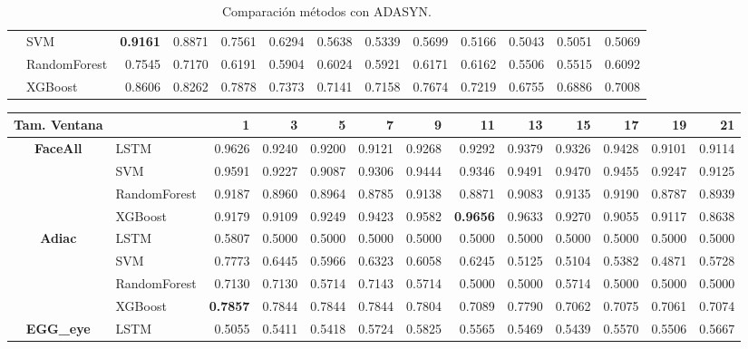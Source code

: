 \begin{table}[h]
\begin{adjustbox}{max width=15cm}
\begin{tabular}{|c|l|r|r|r|r|r|r|r|r|r|r|r|}
		& SVM &  \textbf{0.9161} &  0.8871 &  0.7561 &  0.6294 &  0.5638 &  0.5339 &  0.5699 &  0.5166 &  0.5043 &  0.5051 &  0.5069 \\
		& RandomForest &  0.7545 &  0.7170 &  0.6191 &  0.5904 &  0.6024 &  0.5921 &  0.6171 &  0.6162 &  0.5506 &  0.5515 &  0.6092 \\
		& XGBoost &  0.8606 &  0.8262 &  0.7878 &  0.7373 &  0.7141 &  0.7158 &  0.7674 &  0.7219 &  0.6755 &  0.6886 &  0.7008 \\
		\hline
\end{tabular}
\end{adjustbox}
\caption{Comparación métodos con ADASYN.}
\label{tab:all_comp_adasyn}
\end{table}
\newpage
\begin{table}[h]
\centering
\begin{adjustbox}{max width=15cm}
\begin{tabular}{|c|l|r|r|r|r|r|r|r|r|r|r|r|}
		\hline
		\textbf{Tam. Ventana}&         &      1  &      3  &      5  &      7  &      9  &      11 &      13 &      15 &      17 &      19 &      21 \\
		\hline
		\textbf{FaceAll} & LSTM &  0.9626 &  0.9240 &  0.9200 &  0.9121 &  0.9268 &  0.9292 &  0.9379 &  0.9326 &  0.9428 &  0.9101 &  0.9114 \\
		& SVM &  0.9591 &  0.9227 &  0.9087 &  0.9306 &  0.9444 &  0.9346 &  0.9491 &  0.9470 &  0.9455 &  0.9247 &  0.9125 \\
		& RandomForest &  0.9187 &  0.8960 &  0.8964 &  0.8785 &  0.9138 &  0.8871 &  0.9083 &  0.9135 &  0.9190 &  0.8787 &  0.8939 \\
		& XGBoost &  0.9179 &  0.9109 &  0.9249 &  0.9423 &  0.9582 &  \textbf{0.9656} &  0.9633 &  0.9270 &  0.9055 &  0.9117 &  0.8638 \\
		\hline
		\textbf{Adiac} & LSTM &  0.5807 &  0.5000 &  0.5000 &  0.5000 &  0.5000 &  0.5000 &  0.5000 &  0.5000 &  0.5000 &  0.5000 &  0.5000 \\
		& SVM &  0.7773 &  0.6445 &  0.5966 &  0.6323 &  0.6058 &  0.6245 &  0.5125 &  0.5104 &  0.5382 &  0.4871 &  0.5728 \\
		& RandomForest &  0.7130 &  0.7130 &  0.5714 &  0.7143 &  0.5714 &  0.5000 &  0.5000 &  0.5714 &  0.5000 &  0.5000 &  0.5000 \\
		& XGBoost &  \textbf{0.7857} &  0.7844 &  0.7844 &  0.7844 &  0.7804 &  0.7089 &  0.7790 &  0.7062 &  0.7075 &  0.7061 &  0.7074 \\
		\hline
		\textbf{EGG\_eye} & LSTM &  0.5055 &  0.5411 &  0.5418 &  0.5724 &  0.5825 &  0.5565 &  0.5469 &  0.5439 &  0.5570 &  0.5506 &  0.5667 \\

\end{tabular}
\end{adjustbox}
\end{table}
